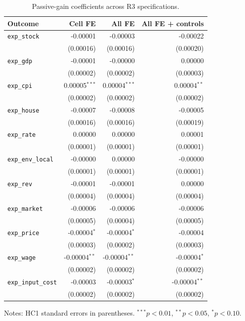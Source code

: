 \documentclass[11pt,letterpaper,english,final]{article}
\begin{document}
\begin{table}[H]
\centering
\scriptsize
\setlength{\tabcolsep}{8pt}
\caption{Passive-gain coefficients across R3 specifications.}
\label{tab:r3_across_specs_20260920}
\begin{tabular}{lrrr}
\toprule
Outcome & Cell FE & All FE & All FE + controls \\
\midrule
\texttt{exp\_stock}       & -0.00001 & -0.00003 & -0.00022 \\
                            & (0.00016) & (0.00016) & (0.00020) \\
\texttt{exp\_gdp}         & -0.00001 & -0.00000 &  0.00000 \\
                            & (0.00002) & (0.00002) & (0.00003) \\
\texttt{exp\_cpi}         &  0.00005$^{***}$ &  0.00004$^{***}$ &  0.00004$^{**}$ \\
                            & (0.00002) & (0.00002) & (0.00002) \\
\texttt{exp\_house}       & -0.00007 & -0.00008 & -0.00005 \\
                            & (0.00016) & (0.00016) & (0.00019) \\
\texttt{exp\_rate}        &  0.00000 &  0.00000 &  0.00001 \\
                            & (0.00001) & (0.00001) & (0.00001) \\
\texttt{exp\_env\_local} & -0.00000 &  0.00000 & -0.00000 \\
                            & (0.00001) & (0.00001) & (0.00001) \\
\texttt{exp\_rev}         & -0.00001 & -0.00001 &  0.00000 \\
                            & (0.00004) & (0.00004) & (0.00004) \\
\texttt{exp\_market}      & -0.00006 & -0.00006 & -0.00006 \\
                            & (0.00005) & (0.00004) & (0.00005) \\
\texttt{exp\_price}       & -0.00004$^{*}$ & -0.00004$^{*}$ & -0.00004 \\
                            & (0.00003) & (0.00002) & (0.00003) \\
\texttt{exp\_wage}        & -0.00004$^{**}$ & -0.00004$^{**}$ & -0.00004$^{*}$ \\
                            & (0.00002) & (0.00002) & (0.00002) \\
\texttt{exp\_input\_cost}& -0.00003 & -0.00003$^{*}$ & -0.00004$^{**}$ \\
                            & (0.00002) & (0.00002) & (0.00002) \\
\bottomrule
\end{tabular}
\begin{flushleft}
\scriptsize Notes: HC1 standard errors in parentheses. $^{***}p<0.01$, $^{**}p<0.05$, $^{*}p<0.10$.
\end{flushleft}
\end{table}
\end{document}
